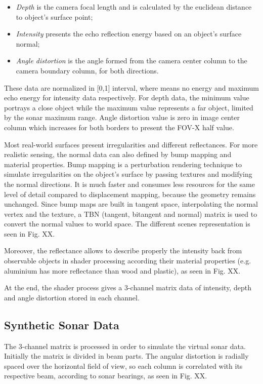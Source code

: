 \documentclass[final,5p,times]{elsarticle}
\begin{document}
\begin{itemize}[(a)]
    \item \textit{Depth} is the camera focal length and is calculated by the euclidean distance to object's surface point;
    \item \textit{Intensity} presents the echo reflection energy based on an object's surface normal;
    \item \textit{Angle distortion} is the angle formed from the camera center column to the camera boundary column, for both directions.
\end{itemize}

These data are normalized in [0,1] interval, where means no energy and maximum echo energy for intensity data respectively. For depth data, the minimum value portrays a close object while the maximum value represents a far object, limited by the sonar maximum range. Angle distortion value is zero in image center column which increases for both borders to present the FOV-X half value.

Most real-world surfaces present irregularities and different reflectances. For more realistic sensing, the normal data can also defined by bump mapping and material properties. Bump mapping is a perturbation rendering technique to simulate irregularities on the object's surface by passing textures and modifying the normal directions. It is much faster and consumes less resources for the same level of detail compared to displacement mapping, because the geometry remains unchanged. Since bump maps are built in tangent space, interpolating the normal vertex and the texture, a TBN (tangent, bitangent and normal) matrix is used to convert the normal values to world space. The different scenes representation is seen in Fig. XX.

Moreover, the reflectance allows to describe properly the intensity back from observable objects in shader processing according their material properties (e.g. aluminium has more reflectance than wood and plastic), as seen in Fig. XX.

At the end, the shader process gives a 3-channel matrix data of intensity, depth and angle distortion stored in each channel.

\subsection{Synthetic Sonar Data}
\label{dev:sonardata}

The 3-channel matrix is processed in order to simulate the virtual sonar data. Initially the matrix is divided in beam parts. The angular distortion is radially spaced over the horizontal field of view, so each column is correlated with its respective beam, according to sonar bearings, as seen in Fig. XX.
\end{document}
